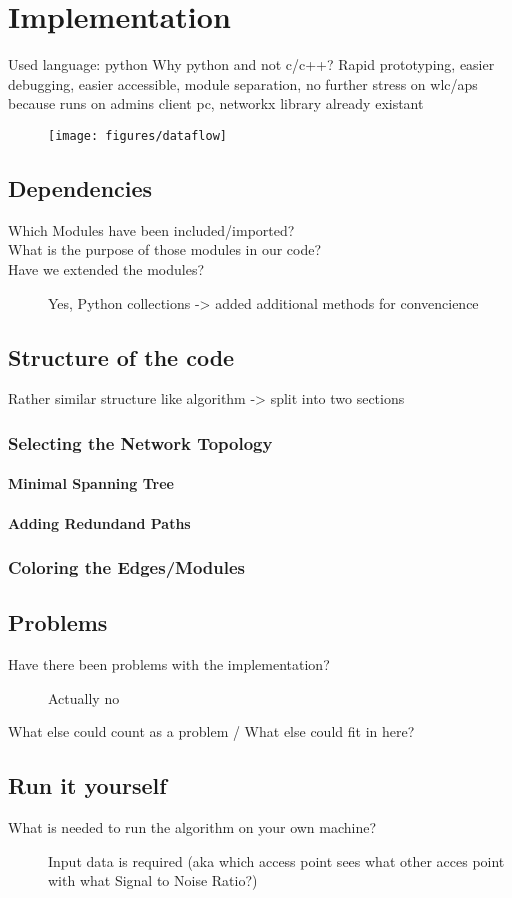 \chapter{Implementation}
  Used language: python\newline
  Why python and not c/c++?
    Rapid prototyping, easier debugging, easier accessible, module separation, no further stress on wlc/aps because runs on admins client pc, networkx library already existant
  \begin{figure}[t]
    \centering
    \texttt{[image: figures/dataflow]}
    \label{fig:dataflow}
  \end{figure}
\section{Dependencies}
  \begin{description}
   \item[Which Modules have been included/imported?]
   \item[What is the purpose of those modules in our code?]
   \item[Have we extended the modules?]
   Yes, Python collections -> added additional methods for convencience
  \end{description}
\section{Structure of the code}
  Rather similar structure like algorithm -> split into two sections
  \subsection{Selecting the Network Topology}
    \subsubsection{Minimal Spanning Tree}
    \subsubsection{Adding Redundand Paths}
  \subsection{Coloring the Edges/Modules}
\section{Problems}
  \begin{description}
   \item[Have there been problems with the implementation?]
   Actually no
   \item[What else could count as a problem / What else could fit in here?]
  \end{description}
\section{Run it yourself}
  \begin{description}
   \item[What is needed to run the algorithm on your own machine?]
    Input data is required (aka which access point sees what other acces point with what Signal to Noise Ratio?) \newline
  \end{description}
